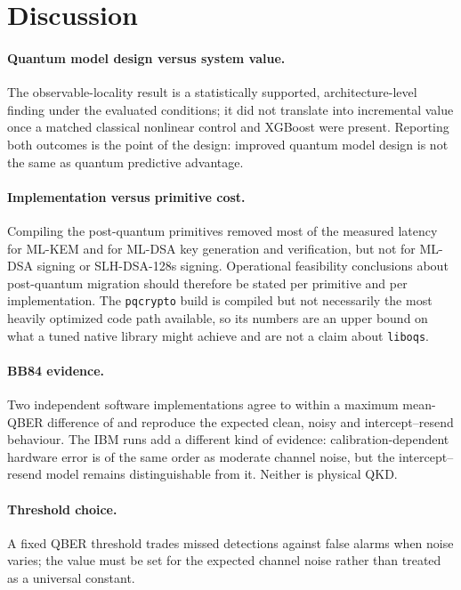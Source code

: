 \section{Discussion}\label{sec:disc}
\paragraph{Quantum model design versus system value.} The observable-locality result is a statistically supported, architecture-level finding under the evaluated conditions; it did not translate into incremental value once a matched classical nonlinear control and XGBoost were present. Reporting both outcomes is the point of the design: improved quantum model design is not the same as quantum predictive advantage.

\paragraph{Implementation versus primitive cost.} Compiling the post-quantum primitives removed most of the measured latency for ML-KEM and for ML-DSA key generation and verification, but not for ML-DSA signing or SLH-DSA-128s signing. Operational feasibility conclusions about post-quantum migration should therefore be stated per primitive and per implementation. The \texttt{pqcrypto} build is compiled but not necessarily the most heavily optimized code path available, so its numbers are an upper bound on what a tuned native library might achieve and are not a claim about \texttt{liboqs}.

\paragraph{BB84 evidence.} Two independent software implementations agree to within a maximum mean-QBER difference of \BbMaxDiff{} and reproduce the expected clean, noisy and intercept--resend behaviour. The IBM runs add a different kind of evidence: calibration-dependent hardware error is of the same order as moderate channel noise, but the intercept--resend model remains distinguishable from it. Neither is physical QKD.

\paragraph{Threshold choice.} A fixed QBER threshold trades missed detections against false alarms when noise varies; the value must be set for the expected channel noise rather than treated as a universal constant.
